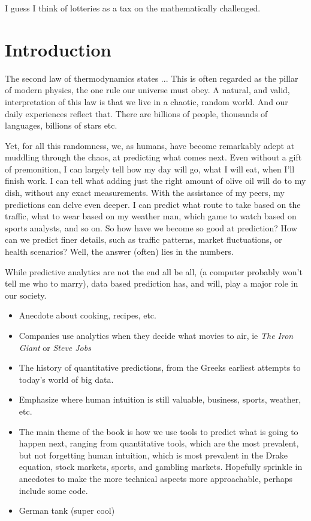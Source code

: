 \documentclass[../../fulltext/fulltext.tex]{subfiles}
\begin{document}
\begin{savequote}[45mm]
	I guess I think of lotteries as a tax on the mathematically challenged.
\end{savequote}

\chapter{Introduction}
The second law of thermodynamics states ...  This is often regarded as the pillar of modern physics, the one rule our universe must obey.  A natural, and valid, interpretation of this law is that we live in a chaotic, random world.  And our daily experiences reflect that.  There are billions of people, thousands of languages, billions of stars etc.  

Yet, for all this randomness, we, as humans, have become remarkably adept at muddling through the chaos, at predicting what comes next.  Even without a gift of premonition, I can largely tell how my day will go, what I will eat, when I'll finish work. I can tell what adding just the right amount of olive oil will do to my dish, without any exact measurements. With the assistance of my peers, my predictions can delve even deeper. I can predict what route to take based on the traffic, what to wear based on my weather man, which game to watch based on sports analysts, and so on.  So how have we become so good at prediction?  How can we predict finer details, such as traffic patterns, market fluctuations, or health scenarios?  Well, the answer (often) lies in the numbers.

While predictive analytics are not the end all be all, (a computer probably won't tell me who to marry), data based prediction has, and will, play a major role in our society.  

\begin{itemize}
\item Anecdote about cooking, recipes, etc.
\item Companies use analytics when they decide what movies to air, ie \emph{The Iron Giant} or \emph{Steve Jobs}
\item The history of quantitative predictions, from the Greeks earliest attempts to today's world of big data.
\item Emphasize where human intuition is still valuable, business, sports, weather, etc. 
\item The main theme of the book is how we use tools to predict what is going to happen next, ranging from quantitative tools, which are the most prevalent, but not forgetting human intuition, which is most prevalent in the Drake equation, stock markets, sports, and gambling markets. Hopefully sprinkle in anecdotes to make the more technical aspects more approachable, perhaps include some code.
\item German tank (super cool)
\end{itemize}
\end{document}
